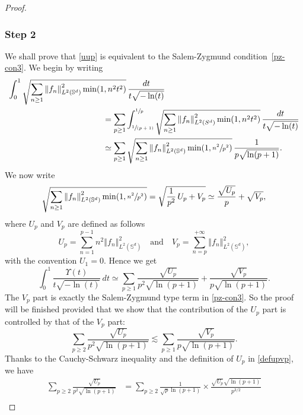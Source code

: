 \documentclass[10pt]{amsart}
\newcommand{\spfrac}[2]{\sfrac{#1}{(#2)}}
\theoremstyle{theorem}
\theoremstyle{definition}
\newcommand\bbS{\mathbb{S}}
\begin{document}
\begin{proof}
\subsubsection*{Step 2} We shall prove that \eqref{uup} is equivalent to the Salem-Zygmund condition~\eqref{pz-con3}. We begin by writing
\begin{align*}
\int_{0}^1 \sqrt{\sum_{n\geq 1} \left\Vert f_n\right\Vert_{L^2(\bbS^d)}^2 \min(1,n^2 t^2)}&\,\frac{dt}{t\sqrt{-\ln(t)}} \\
&\hspace*{-1cm}=
\sum_{p\geq 1} \int_{\spfrac{1}{p+1}}^{\sfrac{1}{p}}\sqrt{\sum_{n\geq 1} \left\Vert f_n\right\Vert_{L^2(S^d)}^2 \min(1,n^2 t^2)}\,\frac{dt}{t\sqrt{-\ln(t)}} \\
&\hspace*{-1cm}\simeq
\sum_{p\geq 1} \sqrt{\sum_{n\geq 1} \left\Vert f_n\right\Vert_{L^2(\bbS^d)}^2 \min(1,\sfrac{n^2}{p^2})} \,\frac{1}{p\sqrt{\ln(p+1)}}.
\end{align*}
We now write
\begin{equation*}
\sqrt{\sum_{n\geq 1} \left\Vert f_n\right\Vert_{L^2(\bbS^d)}^2 \min(1,\sfrac{n^2}{p^2})}=\sqrt{\frac{1}{p^2}\,U_p+V_p}\simeq \frac{\sqrt{U_p}}{p}+\sqrt{V_p},
\end{equation*}
where $U_p$ and $V_p$ are defined as follows
\begin{equation}\label{defupvp}
U_p=\sum_{n=1}^{p-1} n^2 \left\Vert f_n\right\Vert_{L^2(\bbS^d)}^2 \quad \text{and}\quad V_p=\sum_{n=p}^{+\infty} \left\Vert f_n\right\Vert_{L^2(\bbS^d)}^2, \end{equation}
with the convention $U_1=0$. Hence we get
\begin{equation*}
\int_{0}^1 \frac{\Upsilon(t)}{t\sqrt{-\ln(t)}}\,dt
\simeq \sum_{p\geq 1} \frac{\sqrt{U_p}}{p^2\sqrt{\ln(p+1)}}+\frac{\sqrt{V_p}}{p \sqrt{\ln(p+1)}} .
\end{equation*}
The $V_p$ part is exactly the Salem-Zygmund type term in \eqref{pz-con3}. So the proof will be finished provided that we show that the contribution of the $U_p$ part is controlled by that of the $V_p$ part:
\begin{equation}\label{ddom}
\sum_{p\geq 2} \frac{\sqrt{U_p}}{p^2\sqrt{\ln(p+1)}}\lesssim \sum_{p\geq 1} \frac{\sqrt{V_p}}{p\sqrt{\ln(p+1)}}.
\end{equation}
Thanks to the Cauchy-Schwarz inequality and the definition of $U_p$ in \eqref{defupvp}, we have
\begin{align*}
\sum_{p\geq 2} \frac{\sqrt{U_p}}{p^2\sqrt{\ln(p+1)}} & = \sum_{p\geq 2} \frac{1}{\sqrt{p}\ln(p+1)}\times \frac{\sqrt{U_p} \sqrt{\ln(p+1)}}{p^{3/2}} \\

\end{align*}
\end{proof}
\end{document}
